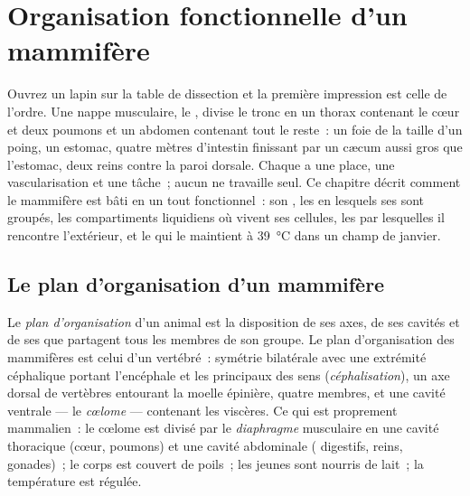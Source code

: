 \chapter{Organisation fonctionnelle d'un mammifère}\label{ch:b1:mammal-organization}

Ouvrez un lapin sur la table de dissection et la première impression est
celle de l'ordre. Une nappe musculaire, le , divise le tronc
en un thorax contenant le cœur et deux poumons et un abdomen contenant
tout le reste~: un foie de la taille d'un poing, un estomac, quatre
mètres d'intestin finissant par un cæcum aussi gros que l'estomac, deux
reins contre la paroi dorsale. Chaque  a une place, une
vascularisation et une tâche~; aucun ne travaille seul. Ce chapitre
décrit comment le mammifère est bâti en un tout fonctionnel~: son , les  en lesquels ses  sont groupés, les
compartiments liquidiens où vivent ses cellules, les 
par lesquelles il rencontre l'extérieur, et le  qui le
maintient à \qty{39}{\celsius} dans un champ de janvier.

\section{Le plan d'organisation d'un mammifère}

\begin{definition}\label{def:b1:mammal-organization:bodyplan}
Le \emph{plan d'organisation} d'un animal est
la disposition de ses axes, de ses cavités et de ses  que
partagent tous les membres de son groupe. Le plan d'organisation des
mammifères est celui d'un vertébré~: symétrie bilatérale avec une
extrémité céphalique portant l'encéphale et les principaux  des
sens (\emph{céphalisation}), un axe dorsal de
vertèbres entourant la moelle épinière, quatre membres, et une cavité
ventrale --- le \emph{cœlome} --- contenant les viscères.
Ce qui est proprement mammalien~: le cœlome est divisé par le
\emph{diaphragme} musculaire en une cavité thoracique
(cœur, poumons) et une cavité abdominale ( digestifs, reins,
gonades)~; le corps est couvert de poils~; les jeunes sont nourris de
lait~; la température est régulée.
\end{definition}

